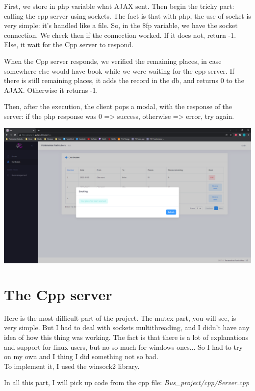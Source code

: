 \documentclass[12pt,a4paper,openany]{book}
\begin{document}
First, we store in php variable what AJAX sent. Then begin the tricky part: calling the cpp server using sockets. The fact is that with php, the use of socket is very simple: it's handled like a file. So, in the \$fp variable, we have the socket connection. We check then if the connection worked. If it does not, return -1. Else, it wait for the Cpp server to respond. 

When the Cpp server responds, we verified the remaining places, in case somewhere else would have book while we were waiting for the cpp server. If there is still remaining places, it adds the record in the db, and returns 0 to the AJAX. Otherwise it returns -1.

Then, after the execution, the client pops a modal, with the response of the server: if the php response was 0 => success, otherwise => error, try again.
\begin{center}
	\includegraphics[scale=0.35]{Figs/fig15}
\end{center}

\section{The Cpp server}
Here is the most difficult part of the project. The mutex part, you will see, is very simple. But I had to deal with sockets multithreading, and I didn't have any idea of how this thing was working. The fact is that there is a lot of explanations and support for linux users, but no so much for windows ones... So I had to try on my own and I thing I did something not so bad.\\

To implement it, I used the winsock2 library.\\

\begin{remarque}
	In all this part, I will pick up code from the cpp file:
	\emph{Bus\_project/cpp/Server.cpp}
\end{remarque}
\end{document}
